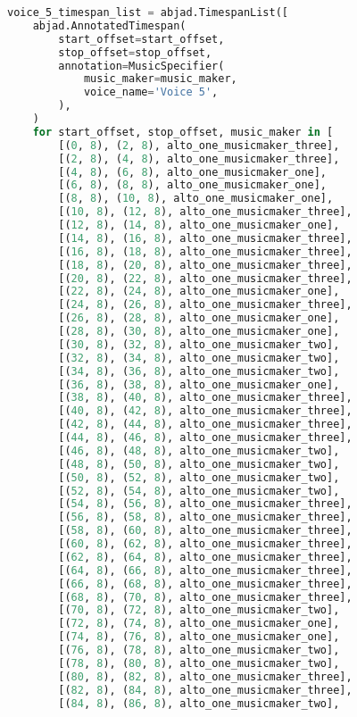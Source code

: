 \begin{lstlisting}[language=Python, caption=Invocation Source Code]
voice_5_timespan_list = abjad.TimespanList([
    abjad.AnnotatedTimespan(
        start_offset=start_offset,
        stop_offset=stop_offset,
        annotation=MusicSpecifier(
            music_maker=music_maker,
            voice_name='Voice 5',
        ),
    )
    for start_offset, stop_offset, music_maker in [
        [(0, 8), (2, 8), alto_one_musicmaker_three],
        [(2, 8), (4, 8), alto_one_musicmaker_three],
        [(4, 8), (6, 8), alto_one_musicmaker_one],
        [(6, 8), (8, 8), alto_one_musicmaker_one],
        [(8, 8), (10, 8), alto_one_musicmaker_one],
        [(10, 8), (12, 8), alto_one_musicmaker_three],
        [(12, 8), (14, 8), alto_one_musicmaker_one],
        [(14, 8), (16, 8), alto_one_musicmaker_three],
        [(16, 8), (18, 8), alto_one_musicmaker_three],
        [(18, 8), (20, 8), alto_one_musicmaker_three],
        [(20, 8), (22, 8), alto_one_musicmaker_three],
        [(22, 8), (24, 8), alto_one_musicmaker_one],
        [(24, 8), (26, 8), alto_one_musicmaker_three],
        [(26, 8), (28, 8), alto_one_musicmaker_one],
        [(28, 8), (30, 8), alto_one_musicmaker_one],
        [(30, 8), (32, 8), alto_one_musicmaker_two],
        [(32, 8), (34, 8), alto_one_musicmaker_two],
        [(34, 8), (36, 8), alto_one_musicmaker_two],
        [(36, 8), (38, 8), alto_one_musicmaker_one],
        [(38, 8), (40, 8), alto_one_musicmaker_three],
        [(40, 8), (42, 8), alto_one_musicmaker_three],
        [(42, 8), (44, 8), alto_one_musicmaker_three],
        [(44, 8), (46, 8), alto_one_musicmaker_three],
        [(46, 8), (48, 8), alto_one_musicmaker_two],
        [(48, 8), (50, 8), alto_one_musicmaker_two],
        [(50, 8), (52, 8), alto_one_musicmaker_two],
        [(52, 8), (54, 8), alto_one_musicmaker_two],
        [(54, 8), (56, 8), alto_one_musicmaker_three],
        [(56, 8), (58, 8), alto_one_musicmaker_three],
        [(58, 8), (60, 8), alto_one_musicmaker_three],
        [(60, 8), (62, 8), alto_one_musicmaker_three],
        [(62, 8), (64, 8), alto_one_musicmaker_three],
        [(64, 8), (66, 8), alto_one_musicmaker_three],
        [(66, 8), (68, 8), alto_one_musicmaker_three],
        [(68, 8), (70, 8), alto_one_musicmaker_three],
        [(70, 8), (72, 8), alto_one_musicmaker_two],
        [(72, 8), (74, 8), alto_one_musicmaker_one],
        [(74, 8), (76, 8), alto_one_musicmaker_one],
        [(76, 8), (78, 8), alto_one_musicmaker_two],
        [(78, 8), (80, 8), alto_one_musicmaker_two],
        [(80, 8), (82, 8), alto_one_musicmaker_three],
        [(82, 8), (84, 8), alto_one_musicmaker_three],
        [(84, 8), (86, 8), alto_one_musicmaker_two],

\end{lstlisting}
